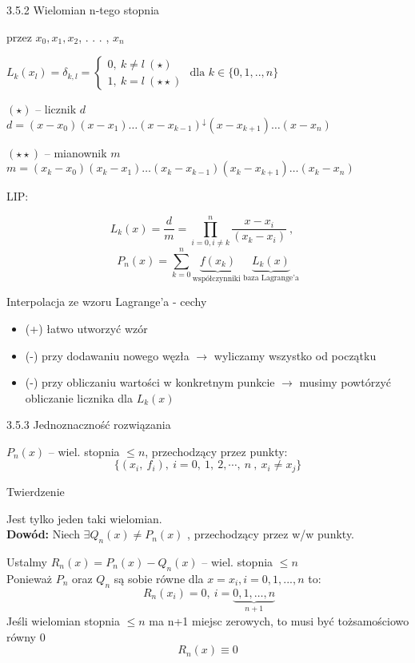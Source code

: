\begin{frame}{3.5.2 Wielomian $\mathrm{n}$-tego stopnia}


przez $x_{0}, x_{1}, x_{2}$, . . . , $x_{n}$

$L_{k}(x_{l})=\delta_{k,l}=\left\{\begin{array}{l}
0,\ k\neq l\ (\star)\ \\
1,\ k=l\ (\star\star)
\end{array}\right. \text{ dla $k \in \{0,1,..,n\} $} $

$(\star)$ -- licznik $d$
$d=(x-x_{0})(x-x_{1})\ldots(x-x_{k-1})^{\downarrow}(x-x_{k+1})\ldots(x-x_{n})$

$(\star\star)$ -- mianownik $m$
$m=(x_{k}-x_{0})(x_{k}-x_{1})\ldots(x_{k}-x_{k-1})(x_{k}-x_{k+1})\ldots(x_{k}-x_{n})$

LIP:

$$L_{k}(x) = \frac{d}{m} = \prod_{i=0,i\neq k}^{n}\frac{x-x_{i}}{(x_{k}-x_{i})}\ , \quad$$
$$P_{n}(x)=\sum_{k=0}^{n}\underbrace{f(x_{k})}_{\text{współczynniki      }}\underbrace{L_{k}(x)}_{\text{baza Lagrange'a}}$$


\end{frame}
\begin{frame}{Interpolacja ze wzoru Lagrange'a - cechy}
\begin{itemize}
    \item (+) łatwo utworzyć wzór
    \item (-) przy dodawaniu nowego węzła $\rightarrow$ wyliczamy wszystko od początku
    \item (-) przy obliczaniu wartości w konkretnym punkcie $\rightarrow$ musimy powtórzyć obliczanie licznika dla $L_{k}(x)$
\end{itemize}
\end{frame}

\begin{frame}{3.5.3 Jednoznaczność rozwiązania}

$P_{n}(x)$ -- wiel. stopnia $\leq n$, przechodzący przez punkty:
$$
\{(x_{i},\ f_{i}),\ i=0,\ 1,\ 2,\cdots ,\ n\ ,\ x_{i}\neq x_{j}\}
$$

\begin{block}{Twierdzenie}

Jest tylko jeden taki wielomian.\\
\vspace{2mm}
\textbf{Dowód:} Niech $\exists Q_{n}(x)\neq P_{n}(x)$ , przechodzący przez w/w punkty.

Ustalmy $R_{n}(x)=P_{n}(x) - Q_{n}(x)$ -- wiel. stopnia $\leq n$\\
Ponieważ $P_{n}$ oraz $Q_{n}$ są sobie równe dla $x=x_i, i=0,1,...,n$ to:
$$
 \: R_{n}(x_{i})=0,\ i=\underbrace{0,1, \dots, n}_{n+1}
$$
Jeśli wielomian  stopnia $\leq n$ ma n+1 miejsc zerowych, to musi być tożsamościowo równy $0$ 
$$
R_{n}(x) \equiv 0
$$
\end{block}
\end{frame}

